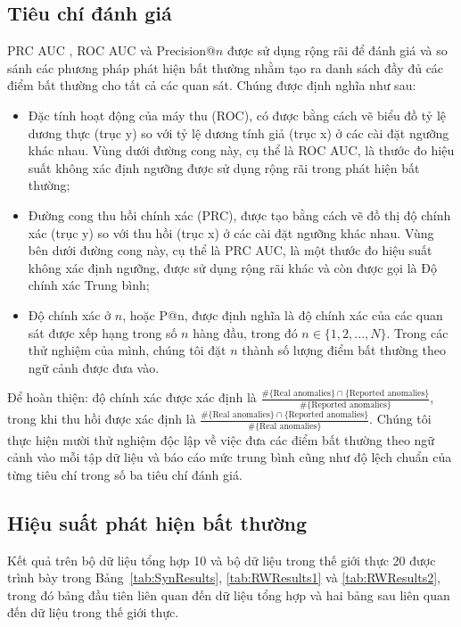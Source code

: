 \subsection{Tiêu chí đánh giá}
\label{subsec:metrics}

PRC AUC \citep{liang2016robust,kuo2018detecting}, ROC AUC \citep{micenkova2014learning, micenkova2015learning, pasillas2016unsupervised} và Precision@$n$ \citep{aggarwal2017outlier} được sử dụng rộng rãi để đánh giá và so sánh các phương pháp phát hiện bất thường nhằm tạo ra danh sách đầy đủ các điểm bất thường cho tất cả các quan sát. Chúng được định nghĩa như sau:
\begin{itemize}
    \item Đặc tính hoạt động của máy thu (ROC), có được bằng cách vẽ biểu đồ tỷ lệ dương thực (trục y) so với tỷ lệ dương tính giả (trục x) ở các cài đặt ngưỡng khác nhau. Vùng dưới đường cong này, cụ thể là ROC AUC, là thước đo hiệu suất không xác định ngưỡng được sử dụng rộng rãi trong phát hiện bất thường;
    \item Đường cong thu hồi chính xác (PRC), được tạo bằng cách vẽ đồ thị độ chính xác (trục y) so với thu hồi (trục x) ở các cài đặt ngưỡng khác nhau. Vùng bên dưới đường cong này, cụ thể là PRC AUC, là một thước đo hiệu suất không xác định ngưỡng, được sử dụng rộng rãi khác và còn được gọi là Độ chính xác Trung bình;
    \item Độ chính xác ở $n$, hoặc P@n, được định nghĩa là độ chính xác của các quan sát được xếp hạng trong số $n$ hàng đầu, trong đó $n\in\{1,2,...,N\}$. Trong các thử nghiệm của mình, chúng tôi đặt $n$ thành số lượng điểm bất thường theo ngữ cảnh được đưa vào.
\end{itemize}
Để hoàn thiện: độ chính xác được xác định là $\frac{\#\{\text{Real anomalies}\} \cap \{\text{Reported anomalies}\}}{\#\{\text{Reported anomalies}\}}$, trong khi thu hồi được xác định là $\frac{\#\{\text{Real anomalies}\} \cap \{\text{Reported anomalies}\}}{\#\{\text{Real anomalies}\}}$. Chúng tôi thực hiện mười thử nghiệm độc lập về việc đưa các điểm bất thường theo ngữ cảnh vào mỗi tập dữ liệu và báo cáo mức trung bình cũng như độ lệch chuẩn của từng tiêu chí trong số ba tiêu chí đánh giá.

\subsection{Hiệu suất phát hiện bất thường} \label{exp:ADPerformance}

Kết quả trên bộ dữ liệu tổng hợp 10 và bộ dữ liệu trong thế giới thực 20 được trình bày trong Bảng~\ref{tab:SynResults}, \ref{tab:RWResults1} và \ref{tab:RWResults2}, trong đó bảng đầu tiên liên quan đến dữ liệu tổng hợp và hai bảng sau liên quan đến dữ liệu trong thế giới thực.



